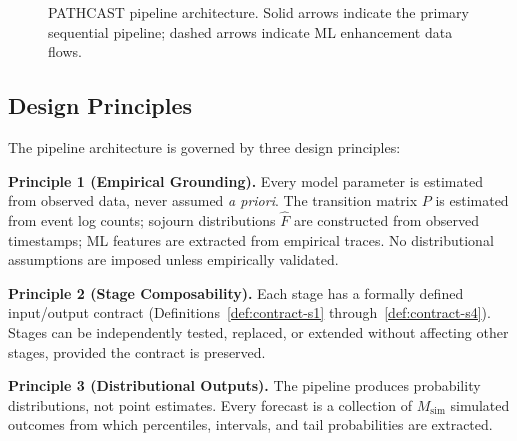 \begin{figure}[htbp]
\caption{PATHCAST pipeline architecture. Solid arrows indicate the
primary sequential pipeline; dashed arrows indicate ML enhancement data flows.}
\label{fig:pipeline-architecture}
\end{figure}


\subsection{Design Principles}
\label{sec:design-principles}

The pipeline architecture is governed by three design principles:

\textbf{Principle 1 (Empirical Grounding).} Every model parameter is
estimated from observed data, never assumed \emph{a priori}. The transition
matrix $P$ is estimated from event log counts; sojourn distributions
$\hat{F}$ are constructed from observed timestamps; ML features are
extracted from empirical traces. No distributional assumptions are imposed
unless empirically validated.

\textbf{Principle 2 (Stage Composability).} Each stage has a formally
defined input/output contract (Definitions~\ref{def:contract-s1}
through~\ref{def:contract-s4}). Stages can be independently tested,
replaced, or extended without affecting other stages, provided the
contract is preserved.

\textbf{Principle 3 (Distributional Outputs).} The pipeline produces
probability distributions, not point estimates. Every forecast is a
collection of $M_{\text{sim}}$ simulated outcomes from which percentiles,
intervals, and tail probabilities are extracted.


